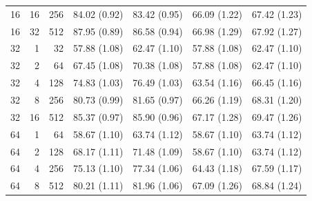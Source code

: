 \begin{table}[p]
\begin{tabular}{@{}rrr rrrr@{}}
16 & 16 & 256 & 84.02 {\scriptsize (0.92)} & 83.42 {\scriptsize (0.95)} & 66.09 {\scriptsize (1.22)} & 67.42 {\scriptsize (1.23)} \\
16 & 32 & 512 & 87.95 {\scriptsize (0.89)} & 86.58 {\scriptsize (0.94)} & 66.98 {\scriptsize (1.29)} & 67.92 {\scriptsize (1.27)} \\
\midrule
32 & 1 & 32 & 57.88 {\scriptsize (1.08)} & 62.47 {\scriptsize (1.10)} & 57.88 {\scriptsize (1.08)} & 62.47 {\scriptsize (1.10)} \\
32 & 2 & 64 & 67.45 {\scriptsize (1.08)} & 70.38 {\scriptsize (1.08)} & 57.88 {\scriptsize (1.08)} & 62.47 {\scriptsize (1.10)} \\
32 & 4 & 128 & 74.83 {\scriptsize (1.03)} & 76.49 {\scriptsize (1.03)} & 63.54 {\scriptsize (1.16)} & 66.45 {\scriptsize (1.16)} \\
32 & 8 & 256 & 80.73 {\scriptsize (0.99)} & 81.65 {\scriptsize (0.97)} & 66.26 {\scriptsize (1.19)} & 68.31 {\scriptsize (1.20)} \\
32 & 16 & 512 & 85.37 {\scriptsize (0.97)} & 85.90 {\scriptsize (0.96)} & 67.17 {\scriptsize (1.28)} & 69.47 {\scriptsize (1.26)} \\
\midrule
64 & 1 & 64 & 58.67 {\scriptsize (1.10)} & 63.74 {\scriptsize (1.12)} & 58.67 {\scriptsize (1.10)} & 63.74 {\scriptsize (1.12)} \\
64 & 2 & 128 & 68.17 {\scriptsize (1.11)} & 71.48 {\scriptsize (1.09)} & 58.67 {\scriptsize (1.10)} & 63.74 {\scriptsize (1.12)} \\
64 & 4 & 256 & 75.13 {\scriptsize (1.10)} & 77.34 {\scriptsize (1.06)} & 64.43 {\scriptsize (1.18)} & 67.59 {\scriptsize (1.17)} \\
64 & 8 & 512 & 80.21 {\scriptsize (1.11)} & 81.96 {\scriptsize (1.06)} & 67.09 {\scriptsize (1.26)} & 68.84 {\scriptsize (1.24)} \\
\bottomrule
\end{tabular}
\end{table}
